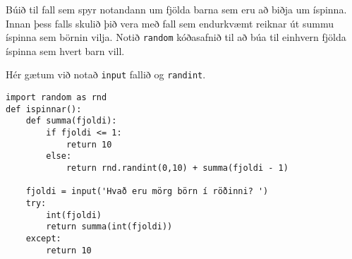 \begin{exercise}\label{rei3}
Búið til fall sem spyr notandann um fjölda barna sem eru að biðja um íspinna.
Innan þess falls skulið þið vera með fall sem endurkvæmt reiknar út summu íspinna sem börnin vilja.
Notið \texttt{random} kóðasafnið til að búa til einhvern fjölda íspinna sem hvert barn vill.
\end{exercise}
\begin{Answer}[ref={rei3}]
Hér gætum við notað \texttt{input} fallið og \texttt{randint}.
	\begin{lstlisting}
import random as rnd
def ispinnar():
	def summa(fjoldi):
		if fjoldi <= 1:
			return 10
		else:
			return rnd.randint(0,10) + summa(fjoldi - 1)

	fjoldi = input('Hvað eru mörg börn í röðinni? ')
	try:
		int(fjoldi)
		return summa(int(fjoldi))
	except:
		return 10
	\end{lstlisting}
\end{Answer}